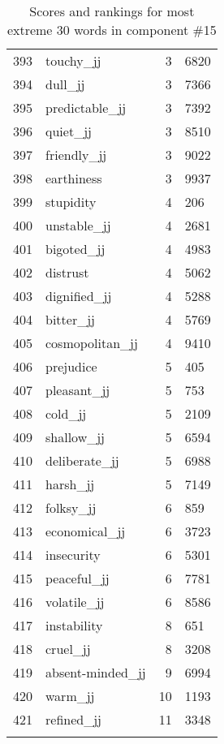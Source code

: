 \begin{longtable}[!htbp]{| rlr@{.}l |}
    393 & touchy\_jj & 3 & 6820 \\
    394 & dull\_jj & 3 & 7366 \\
    395 & predictable\_jj & 3 & 7392 \\
    396 & quiet\_jj & 3 & 8510 \\
    397 & friendly\_jj & 3 & 9022 \\
    398 & earthiness & 3 & 9937 \\
    399 & stupidity & 4 & 206 \\
    400 & unstable\_jj & 4 & 2681 \\
    401 & bigoted\_jj & 4 & 4983 \\
    402 & distrust & 4 & 5062 \\
    403 & dignified\_jj & 4 & 5288 \\
    404 & bitter\_jj & 4 & 5769 \\
    405 & cosmopolitan\_jj & 4 & 9410 \\
    406 & prejudice & 5 & 405 \\
    407 & pleasant\_jj & 5 & 753 \\
    408 & cold\_jj & 5 & 2109 \\
    409 & shallow\_jj & 5 & 6594 \\
    410 & deliberate\_jj & 5 & 6988 \\
    411 & harsh\_jj & 5 & 7149 \\
    412 & folksy\_jj & 6 & 859 \\
    413 & economical\_jj & 6 & 3723 \\
    414 & insecurity & 6 & 5301 \\
    415 & peaceful\_jj & 6 & 7781 \\
    416 & volatile\_jj & 6 & 8586 \\
    417 & instability & 8 & 651 \\
    418 & cruel\_jj & 8 & 3208 \\
    419 & absent-minded\_jj & 9 & 6994 \\
    420 & warm\_jj & 10 & 1193 \\
    421 & refined\_jj & 11 & 3348 \\
    \hline
    \caption{Scores and rankings for most extreme 30 words in component \#15} \\
\end{longtable}
